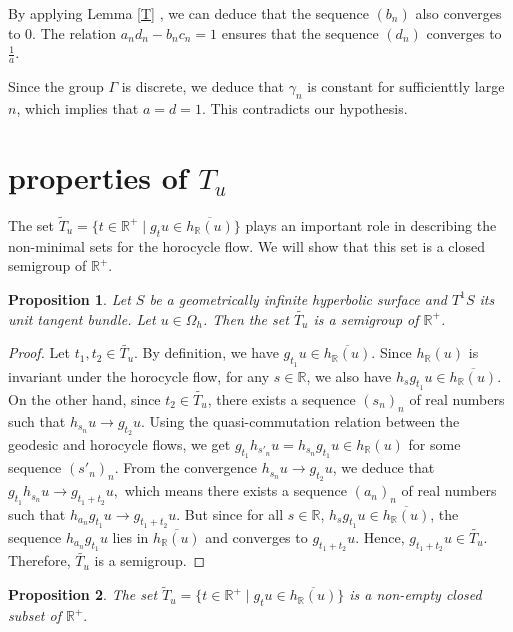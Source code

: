 \documentclass[11pt]{amsart}
\newtheorem{prp}{Proposition}
\begin{document}
By applying Lemma \ref{T} , we can deduce that the sequence $(b_n)$ also converges to $0$.
The relation $a_n d_n - b_n c_n = 1$ ensures that the sequence $(d_n)$ converges to $\frac{1}{a}$.

Since the group $\Gamma$ is discrete, we deduce that $\gamma_n$ is constant for sufficienttly large $n$, which implies that $a=d=1$. This contradicts our hypothesis.


\section{properties of $T_{u}$}

The set $\tilde{T}_u = \{ t \in \mathbb{R}^+ \mid g_t u \in\overline{ h_{\mathbb{R}}(u)} \}$ plays an important role in describing the non-minimal sets for the horocycle flow. We will show that this set is a closed semigroup of $\mathbb{R}^+$.

\begin{prp}
Let $S$ be a geometrically infinite hyperbolic surface and $T^1S$ its unit tangent bundle. Let $u \in \Omega_h$. Then the set $\tilde{T_u}$ is a semigroup of $\mathbb{R}^+$.
\end{prp}

\begin{proof}
Let $t_1, t_2 \in \tilde{T_u}$. By definition, we have 
$g_{t_1} u \in \overline{h_{\mathbb{R}}(u)}.$
Since $h_{\mathbb{R}}(u)$ is invariant under the horocycle flow, for any $s \in \mathbb{R}$, we also have $h_s g_{t_1} u \in \overline{h_{\mathbb{R}}(u)}.$
On the other hand, since $t_2 \in \tilde{T_u}$, there exists a sequence $(s_n)_n$ of real numbers such that $h_{s_n} u \to g_{t_2} u.$
Using the quasi-commutation relation between the geodesic and horocycle flows, we get $
g_{t_1} h_{s'_n} u = h_{s_n} g_{t_1} u \in h_{\mathbb{R}}(u)$
for some sequence $(s'_n)_n$. From the convergence $h_{s_n} u \to g_{t_2} u$, we deduce that $g_{t_1} h_{s_n} u \to g_{t_1 + t_2} u,
$ which means there exists a sequence \((a_n)_n\) of real numbers such that $h_{a_n} g_{t_1} u \to g_{t_1 + t_2} u.$
But since for all \(s \in \mathbb{R}\), \(h_s g_{t_1} u \in \overline{h_{\mathbb{R}}(u)}\), the sequence \(h_{a_n} g_{t_1} u\) lies in $\overline{h_{\mathbb{R}}(u)}$ and converges to \(g_{t_1 + t_2} u\). Hence,
$g_{t_1 + t_2} u \in \tilde{T_u}.$
Therefore, \(\tilde{T_u}\) is a semigroup.
\end{proof}
\newpage
\begin{prp}
The set $\tilde{T}_u = \{ t \in \mathbb{R}^+ \mid g_t u \in \overline{h_{\mathbb{R}}(u)} \}$ is a non-empty closed subset of $\mathbb{R}^+.$
\end{prp}
\end{document}
